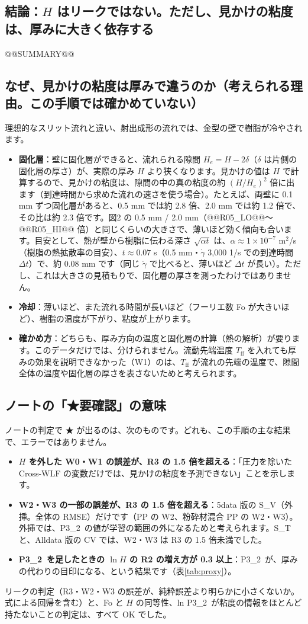 \documentclass[paper=a4paper,fontsize=10.5pt,line_length=44zw,number_of_lines=38]{jlreq}
\newcommand{\gd}{\dot{\gamma}}
\newcommand{\Tff}{T_{\mathrm{ff}}}
\newcommand{\PII}{P3\_2}
\newenvironment{points}{\begin{itemize}[label=$\triangleright$,leftmargin=1.5\zw,itemsep=0.3ex,topsep=0.5ex,parsep=0pt]}{\end{itemize}}
\newcommand{\pt}[1]{\item \textbf{#1}：}
\begin{document}
\subsection{結論：$H$ はリークではない。ただし、見かけの粘度は、厚みに大きく依存する}
@@SUMMARY@@

\subsection{なぜ、見かけの粘度は厚みで違うのか（考えられる理由。この手順では確かめていない）}
理想的なスリット流れと違い、射出成形の流れでは、金型の壁で樹脂が冷やされます。
\begin{points}
\pt{固化層}壁に固化層ができると、流れられる隙間 $H_e = H - 2\delta$（$\delta$ は片側の固化層の厚さ）が、実際の厚み $H$ より狭くなります。見かけの値は $H$ で計算するので、見かけの粘度は、隙間の中の真の粘度の約 $(H/H_e)^2$ 倍に出ます（到達時間から求めた流れの速さを使う場合）。たとえば、両壁に 0.1 mm ずつ固化層があると、0.5 mm では約 2.8 倍、2.0 mm では約 1.2 倍で、その比は約 2.3 倍です。図2 の 0.5 mm / 2.0 mm（@@R05_LO@@〜@@R05_HI@@ 倍）と同じくらいの大きさで、薄いほど効く傾向も合います。目安として、熱が壁から樹脂に伝わる深さ $\sqrt{\alpha t}$ は、$\alpha \approx 1\times10^{-7}$ m$^2$/s（樹脂の熱拡散率の目安）、$t \approx 0.07$ s（0.5 mm・$\gd$ 3,000 1/s での到達時間 $\Delta t$）で、約 0.08 mm です（同じ $\gd$ で比べると、薄いほど $\Delta t$ が長い）。ただし、これは大きさの見積もりで、固化層の厚さを測ったわけではありません。
\pt{冷却}薄いほど、また流れる時間が長いほど（フーリエ数 Fo が大きいほど）、樹脂の温度が下がり、粘度が上がります。
\pt{確かめ方}どちらも、厚み方向の温度と固化層の計算（熱の解析）が要ります。このデータだけでは、分けられません。流動先端温度 $\Tff$ を入れても厚みの効果を説明できなかった（W1）のは、$\Tff$ が流れの先端の温度で、隙間全体の温度や固化層の厚さを表さないためと考えられます。
\end{points}

\subsection{ノートの「★要確認」の意味}
ノートの判定で ★ が出るのは、次のものです。どれも、この手順の主な結果で、エラーではありません。
\begin{points}
\pt{$H$ を外した W0・W1 の誤差が、R3 の 1.5 倍を超える}「圧力を除いた Cross-WLF の変数だけでは、見かけの粘度を予測できない」ことを示します。
\pt{W2・W3 の一部の誤差が、R3 の 1.5 倍を超える}5data 版の S\_V（外挿。全体の RMSE）だけです（PP の W2、粉砕材混合 PP の W2・W3）。外挿では、\PII\ の値が学習の範囲の外になるためと考えられます。S\_T と、Alldata 版の CV では、W2・W3 は R3 の 1.5 倍未満でした。
\pt{\PII\ を足したときの $\ln H$ の R2 の増え方が 0.3 以上}\PII\ が、厚みの代わりの目印になる、という結果です（表\ref{tab:proxy}）。
\end{points}
リークの判定（R3・W2・W3 の誤差が、純粋誤差より明らかに小さくないか。式による回帰を含む）と、Fo と $H$ の同等性、ln \PII\ が粘度の情報をほとんど持たないことの判定は、すべて OK でした。
\end{document}
